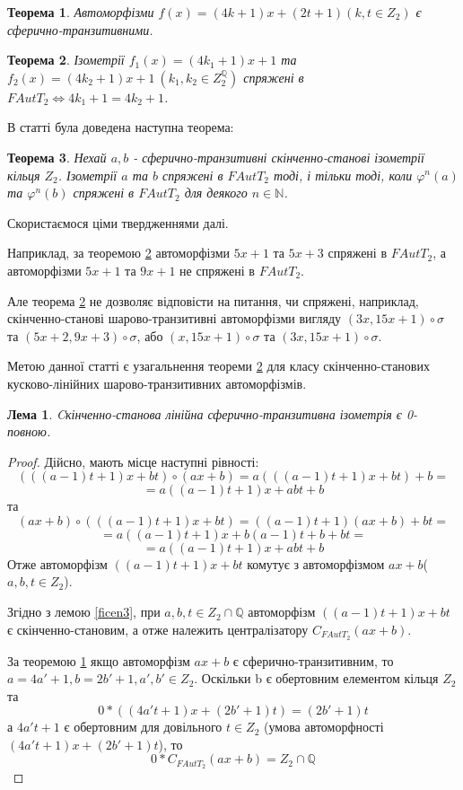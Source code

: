 \documentclass[a4paper,12pt]{article} \usepackage{a4wide}
\numberwithin{equation}{subsection}
\newtheorem{theorem}{Теорема}[subsection]
\newtheorem{lemma}{Лема}[subsection]
\begin{document}
\begin{theorem}\label{4k_1_sph_transitive}
  Автоморфізми $f(x)=(4k+1)x+(2t+1) (k, t\in Z_2)$ є
  сферично-транзитивними.
\end{theorem}

\begin{theorem}\label{conj_ax_p}
  Ізометрії $f_1(x)=(4k_1+1)x+1$ та $f_2(x)=(4k_2+1)x+1 \ (k_1,k_2 \in
  Z_2^{\mathbb{Q}})$ спряжені в $FAutT_2 \Leftrightarrow
  4k_1+1=4k_2+1$.
\end{theorem}

В статті \cite{M_2} була доведена наступна теорема:
\begin{theorem}\label{conj_null_full_izom}
  Нехай $a, b$ - сферично-транзитивні скінченно-станові
  ізометрії кільця $Z_2$. Ізометрії $a$ та $b$ спряжені в $FAutT_2$ тоді, і
  тільки тоді, коли $\varphi^n(a)$ та $\varphi^n(b)$ спряжені в
  $FAutT_2$ для деякого $n \in \mathbb{N}$.
\end{theorem}
Скористаємося ціми твердженнями далі.

 

   Наприклад, за теоремою \ref{conj_ax_p} автоморфізми $5x+1$ та $5x+3$ спряжені в $FAutT_2$, а автоморфізми  $5x+1$ та $9x+1$ не спряжені в $FAutT_2$.


 

Але теорема \ref{conj_ax_p} не дозволяє відповісти на питання, чи спряжені, наприклад, скінченно-станові шарово-транзитивні автоморфізми вигляду $(3x,15x+1)\circ\sigma$ та $(5x+2,9x+3)\circ\sigma$, або $(x,15x+1)\circ\sigma$ та $(3x,15x+1)\circ\sigma$.

Метою данної статті є узагальнення теореми \ref{conj_ax_p} для класу скінченно-станових кусково-лінійних шарово-транзитивних автоморфізмів. 

\begin{lemma}\label{null_linear_transitive}
  Cкінченно-станова лінійна сферично-транзитивна ізометрія є 0-повною.
\end{lemma}
\begin{proof}
  Дійсно, мають місце наступні рівності:
$$(((a-1)t+1)x+bt)\circ (ax + b) = a(((a-1)t+1)x+bt) + b =$$ $$ =a((a-1)t+1)x+abt+b$$
та
$$(ax + b)\circ (((a-1)t+1)x+bt)  = ((a-1)t+1)(ax + b)+bt =$$ $$= a((a-1)t+1)x + b(a-1)t + b + bt =$$ $$= a((a-1)t+1)x+abt+b $$
Отже автоморфізм $((a-1)t+1)x+bt$ комутує з автоморфізмом
$ax+b$($a,b,t \in Z_2$).

Згідно з лемою \ref{ficen3}, при $a,b,t \in Z_2\cap \mathbb{Q}$
автоморфізм $((a-1)t+1)x+bt$ є скінченно-становим, а отже належить
централізатору $C_{FAutT_2}(ax+b)$.

За теоремою \ref{4k_1_sph_transitive} якщо автоморфізм $ax+b$ є
сферично-транзитивним, то $a = 4a'+1, b = 2b'+1, a',b' \in
Z_2$. Оскільки b є обертовним елементом кільця $Z_2$ та
$$0*((4a't+1)x+(2b'+1)t) = (2b'+1)t$$ а $4a't+1$ є обертовним для
довільного $t\in Z_2$ (умова автоморфності $(4a't+1)x+(2b'+1)t$), то
$$0*C_{FAutT_2}(ax+b) = Z_2\cap \mathbb{Q}$$
\end{proof}
\end{document}
